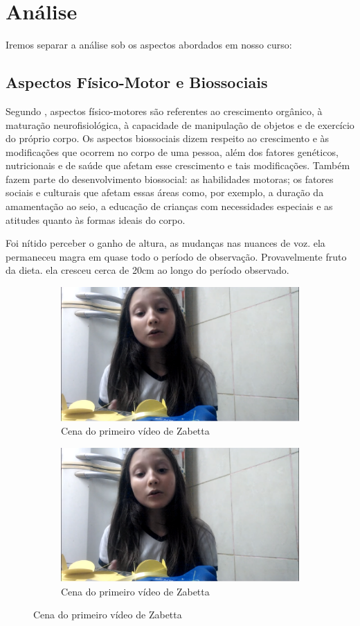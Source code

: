 \section{Análise}

Iremos separar a análise sob os aspectos abordados em nosso curso:

\subsection{Aspectos Físico-Motor e Biossociais}

Segundo , aspectos físico-motores são referentes ao crescimento orgânico, à maturação neurofisiológica, à capacidade de manipulação de objetos e de exercício do próprio corpo.
Os aspectos biossociais dizem respeito ao crescimento e às modificações que ocorrem no corpo de uma pessoa, além dos fatores genéticos, nutricionais e de saúde que afetam esse crescimento e tais modificações. Também fazem parte do desenvolvimento biossocial: as habilidades motoras; os fatores sociais e culturais que afetam essas áreas como, por exemplo, a duração da amamentação ao seio, a educação de crianças com necessidades especiais e as atitudes quanto às formas ideais do corpo.

Foi nítido perceber o ganho de altura, as mudanças nas nuances de voz. ela permaneceu magra em quase todo o período de observação. Provavelmente fruto da dieta. ela cresceu cerca de 20cm ao longo do período observado.


\begin{figure}[h!]
    \centering

    \begin{subfigure}{.5\textwidth}
        \centering
        \includegraphics[width=0.45\linewidth]{fig/Zabetta-13-anos-primeiro-video}
        \caption{Cena do primeiro vídeo de Zabetta}
        \label{fig:comparacao_a}
    \end{subfigure}%

    \begin{subfigure}{.5\textwidth}
        \centering
        \includegraphics[width=0.45\linewidth]{fig/Zabetta-13-anos-primeiro-video}
        \caption{Cena do primeiro vídeo de Zabetta}
        \label{fig:zabetta-13-anos-primeiro-video}
    \end{subfigure}%

\end{figure}




